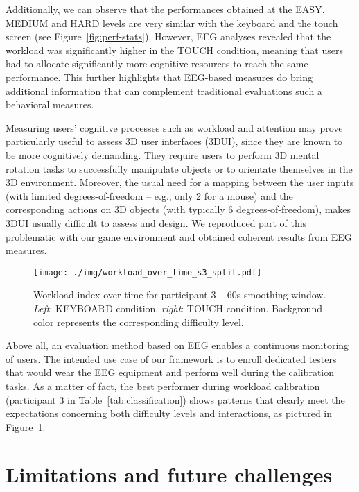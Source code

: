 \documentclass[]{sigchi}
\begin{document}
Additionally, we can observe that the performances obtained at the EASY,
MEDIUM and HARD levels are very similar with the keyboard and the touch
screen (see Figure~\ref{fig:perf-stats}). However, EEG analyses revealed
that the workload was significantly higher in the TOUCH condition,
meaning that users had to allocate significantly more cognitive
resources to reach the same performance. This further highlights that
EEG-based measures do bring additional information that can complement
traditional evaluations such a behavioral measures.

Measuring users' cognitive processes such as workload and attention may
prove particularly useful to assess 3D user interfaces (3DUI), since
they are known to be more cognitively demanding. They require users to
perform 3D mental rotation tasks to successfully manipulate objects or
to orientate themselves in the 3D environment. Moreover, the usual need
for a mapping between the user inputs (with limited degrees-of-freedom
-- e.g., only 2 for a mouse) and the corresponding actions on 3D objects
(with typically 6 degrees-of-freedom), makes 3DUI usually difficult to
assess and design. We reproduced part of this problematic with our game
environment and obtained coherent results from EEG measures.

\begin{figure}
\centering
\texttt{[image: ./img/workload\_over\_time\_s3\_split.pdf]}
\caption{Workload index over time for participant 3 -- 60s smoothing
window. \emph{Left}: KEYBOARD condition, \emph{right}: TOUCH condition.
Background color represents the corresponding difficulty
level.}\label{fig:workload-continuous}
\end{figure}

Above all, an evaluation method based on EEG enables a continuous
monitoring of users. The intended use case of our framework is to enroll
dedicated testers that would wear the EEG equipment and perform well
during the calibration tasks. As a matter of fact, the best performer
during workload calibration (participant 3 in
Table~\ref{tab:classification}) shows patterns that clearly meet the
expectations concerning both difficulty levels and interactions, as
pictured in Figure~\ref{fig:workload-continuous}.

\section{Limitations and future
challenges}\label{limitations-and-future-challenges}
\end{document}
